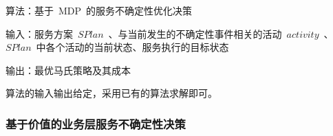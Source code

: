 %

算法：基于~MDP~的服务不确定性优化决策

输入：服务方案~$SPlan$~、与当前发生的不确定性事件相关的活动~$activity$~、
~$SPlan$~中各个活动的当前状态、服务执行的目标状态

输出：最优马氏策略及其成本

算法的输入输出给定，采用已有的算法求解即可。

%
%
%
%
%
%
%
%
%

\subsubsection{基于价值的业务层服务不确定性决策}


